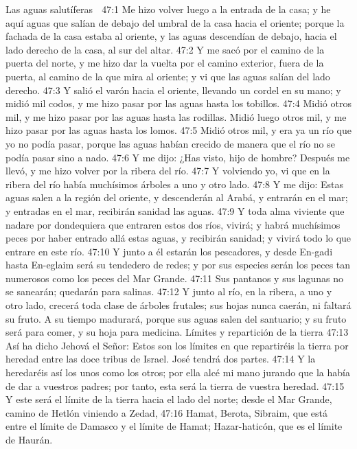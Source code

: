 Las aguas salutíferas  

47:1 Me hizo volver luego a la entrada de la casa; y he aquí aguas que salían de debajo del umbral de la casa hacia el oriente; porque la fachada de la casa estaba al oriente, y las aguas descendían de debajo, hacia el lado derecho de la casa, al sur del altar.  
47:2 Y me sacó por el camino de la puerta del norte, y me hizo dar la vuelta por el camino exterior, fuera de la puerta, al camino de la que mira al oriente; y vi que las aguas salían del lado derecho.  
47:3 Y salió el varón hacia el oriente, llevando un cordel en su mano; y midió mil codos,  y me hizo pasar por las aguas hasta los tobillos.  
47:4 Midió otros mil, y me hizo pasar por las aguas hasta las rodillas. Midió luego otros mil, y me hizo pasar por las aguas hasta los lomos.  
47:5 Midió otros mil, y era ya un río que yo no podía pasar, porque las aguas habían crecido de manera que el río no se podía pasar sino a nado.  
47:6 Y me dijo: ¿Has visto, hijo de hombre? Después me llevó, y me hizo volver por la ribera del río.  
47:7 Y volviendo yo, vi que en la ribera del río había muchísimos árboles a uno y otro lado.  
47:8 Y me dijo: Estas aguas salen a la región del oriente, y descenderán al Arabá, y entrarán en el mar; y entradas en el mar, recibirán sanidad las aguas.  
47:9 Y toda alma viviente que nadare por dondequiera que entraren estos dos ríos, vivirá; y habrá muchísimos peces por haber entrado allá estas aguas, y recibirán sanidad; y vivirá todo lo que entrare en este río.  
47:10 Y junto a él estarán los pescadores, y desde En-gadi hasta En-eglaim será su tendedero de redes; y por sus especies serán los peces tan numerosos como los peces del Mar Grande.  
47:11 Sus pantanos y sus lagunas no se sanearán; quedarán para salinas.  
47:12 Y junto al río, en la ribera, a uno y otro lado, crecerá toda clase de árboles frutales; sus hojas nunca caerán, ni faltará su fruto. A su tiempo madurará, porque sus aguas salen del santuario; y su fruto será para comer, y su hoja para medicina.  
Límites y repartición de la tierra  
47:13 Así ha dicho Jehová el Señor: Estos son los límites en que repartiréis la tierra por heredad entre las doce tribus de Israel. José tendrá dos partes.  
47:14 Y la heredaréis así los unos como los otros; por ella alcé mi mano jurando que la había de dar a vuestros padres; por tanto, esta será la tierra de vuestra heredad.  
47:15 Y este será el límite de la tierra hacia el lado del norte; desde el Mar Grande, camino de Hetlón viniendo a Zedad,  
47:16 Hamat, Berota, Sibraim, que está entre el límite de Damasco y el límite de Hamat; Hazar-haticón, que es el límite de Haurán.  
